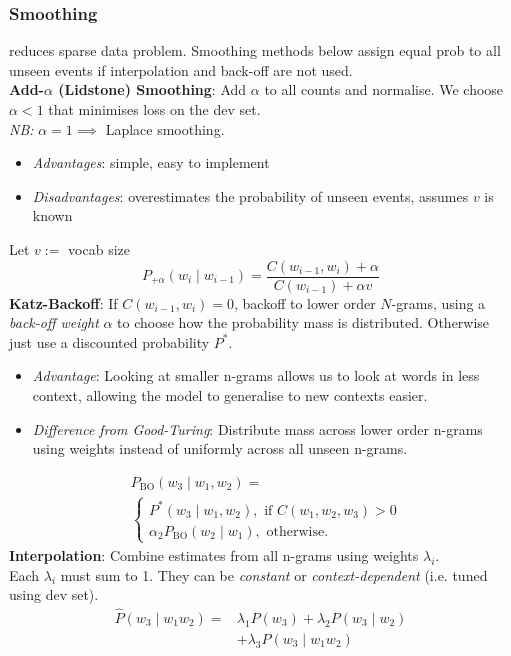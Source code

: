 \documentclass[8pt]{extarticle} %
\begin{document}
\begin{multicols*}{3}
\subsubsection*{Smoothing} 
reduces sparse data problem. Smoothing methods below assign equal prob to all unseen events if interpolation and back-off are not used.\\

\textbf{Add-$\alpha$ (Lidstone) Smoothing}: Add $\alpha$ to all counts and normalise. 
We choose $\alpha<1$ that minimises loss on the dev set. \\
\textit{NB:} $\alpha = 1 \implies$ Laplace smoothing.
\begin{itemize}[label=\textbullet, labelsep=0.3em, leftmargin=0.5em, itemsep=0em]
    \item \textit{Advantages}: simple, easy to implement
    \item \textit{Disadvantages}: overestimates the probability of unseen events, assumes $v$ is known
\end{itemize}
Let $v:=$ vocab size
$$
P_{+\alpha}\left(w_i \mid w_{i-1}\right)=\frac{C\left(w_{i-1}, w_i\right)+\alpha}{C\left(w_{i-1}\right)+\alpha v}
$$
\textbf{Katz-Backoff}: 
If $C(w_{i-1}, w_i)=0$, backoff to lower order $N$-grams, using a \textit{back-off weight} $\alpha$ to choose how the probability mass is distributed. Otherwise just use a discounted probability $P^*$.
\begin{itemize}[label=\textbullet, labelsep=0.3em, leftmargin=0.5em, itemsep=0em]
\item \textit{Advantage}: Looking at smaller n-grams allows us to look at words in less context, allowing the model to generalise to new contexts easier. 
\item \textit{Difference from Good-Turing}: Distribute mass across lower order n-grams using weights instead of uniformly across all unseen n-grams. 
\end{itemize}
\begin{align*}
   &P_{\mathrm{BO}}\left(w_3 \mid w_{1}, w_2 \right)= \\
    &\begin{cases}P^*\left(w_3 \mid w_{1}, w_2 \right), \text { if } C\left(w_{1}, w_2, w_3\right)>0 \\ \alpha_{2} P_{\mathrm{BO}}\left(w_2 \mid w_1\right), \text { otherwise. }\end{cases}
\end{align*}
\textbf{Interpolation}: Combine estimates from all n-grams using weights $\lambda_i$.\\
Each $\lambda_i$ must sum to 1. They can be \textit{constant} or \textit{context-dependent} (i.e. tuned using dev set).
$$\begin{aligned} \hat{P}\left(w_3 \mid w_{1} w_{2}\right)= & \lambda_1 P\left(w_3\right) +\lambda_2 P\left(w_3 \mid w_{2}\right) \\ & +\lambda_3 P\left(w_3 \mid w_{1} w_{2}\right)\end{aligned}$$


\end{multicols*}
\end{document}
